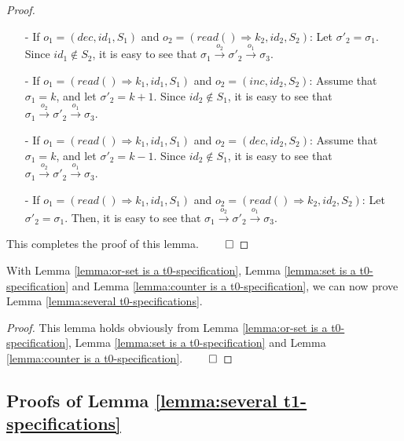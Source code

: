 {\begin {proof}
\begin{itemize}
\item[-] If $o_1 = (\mathit{dec},\mathit{id}_1,S_1)$ and $o_2 = (\mathit{read}() \Rightarrow k_2,\mathit{id}_2,S_2)$: Let $\sigma'_2 = \sigma_1$. Since $\mathit{id}_1 \notin S_2$, it is easy to see that $\sigma_1 {\xrightarrow{o_2}} \sigma'_2 {\xrightarrow{o_1}} \sigma_3$.

\item[-] If $o_1 = (\mathit{read}() \Rightarrow k_1,\mathit{id}_1,S_1)$ and $o_2 = (\mathit{inc},\mathit{id}_2,S_2)$: Assume that $\sigma_1 = k$, and let $\sigma'_2 = \mathit{k+1}$. Since $\mathit{id}_2 \notin S_1$, it is easy to see that $\sigma_1 {\xrightarrow{o_2}} \sigma'_2 {\xrightarrow{o_1}} \sigma_3$.

\item[-] If $o_1 = (\mathit{read}() \Rightarrow k_1,\mathit{id}_1,S_1)$ and $o_2 = (\mathit{dec},\mathit{id}_2,S_2)$: Assume that $\sigma_1 = k$, and let $\sigma'_2 = \mathit{k-1}$. Since $\mathit{id}_2 \notin S_1$, it is easy to see that $\sigma_1 {\xrightarrow{o_2}} \sigma'_2 {\xrightarrow{o_1}} \sigma_3$.

\item[-] If $o_1 = (\mathit{read}() \Rightarrow k_1,\mathit{id}_1,S_1)$ and $o_2 = (\mathit{read}() \Rightarrow k_2,\mathit{id}_2,S_2)$: Let $\sigma'_2 = \sigma_1$. Then, it is easy to see that $\sigma_1 {\xrightarrow{o_2}} \sigma'_2 {\xrightarrow{o_1}} \sigma_3$.
\end{itemize}

This completes the proof of this lemma. $\qed$
\end {proof}


With Lemma \ref{lemma:or-set is a t0-specification}, Lemma \ref{lemma:set is a t0-specification} and Lemma \ref{lemma:counter is a t0-specification}, we can now prove Lemma \ref{lemma:several t0-specifications}.


\SeveralTZeroSpecifications*

\begin {proof}
This lemma holds obviously from Lemma \ref{lemma:or-set is a t0-specification}, Lemma \ref{lemma:set is a t0-specification} and Lemma \ref{lemma:counter is a t0-specification}. $\qed$
\end {proof}





\subsection{Proofs of Lemma \ref{lemma:several t1-specifications}}
\label{subsec:appendix proofs of Lemma several t1-specifications}


}
